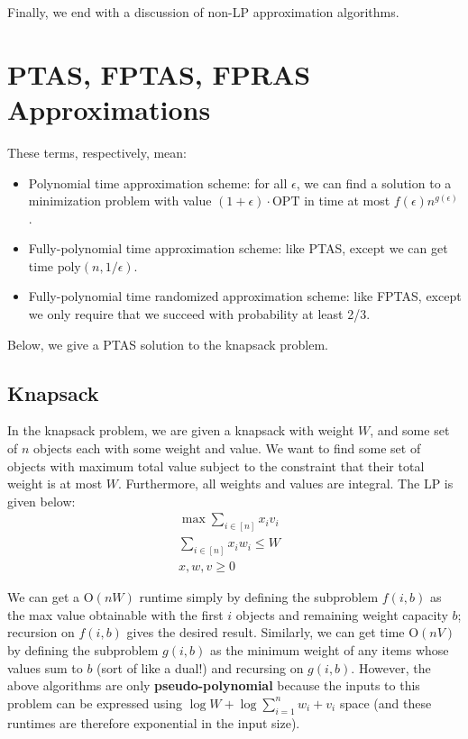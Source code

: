 \documentclass[11pt]{article}
\newcommand{\bigO}{\text{O}}
\begin{document}
Finally, we end with a discussion of non-LP approximation algorithms.

\section{PTAS, FPTAS, FPRAS Approximations}
These terms, respectively, mean:
\begin{itemize}
\setlength\itemsep{0cm}
\item Polynomial time approximation scheme: for all $\epsilon$, we can find a solution to a minimization problem with value $(1+\epsilon) \cdot \text{OPT}$ in time at most $f(\epsilon) n^{g(\epsilon)}$.
\item Fully-polynomial time approximation scheme: like PTAS, except we can get time $\text{poly}(n, 1/\epsilon)$.
\item Fully-polynomial time randomized approximation scheme: like FPTAS, except we only require that we succeed with probability at least 2/3.
\end{itemize}

Below, we give a PTAS solution to the knapsack problem.

\subsection{Knapsack}
In the knapsack problem, we are given a knapsack with weight $W$, and some set of $n$ objects each with some weight and value.  We want to find some set of objects with maximum total value subject to the constraint that their total weight is at most $W$.  Furthermore, all weights and values are integral.  The LP is given below:
\begin{align*}
\max \sum_{i \in [n]} x_i v_i & \\
\sum_{i \in [n]} x_i w_i \le W & \\
x, w, v \ge 0 &
\end{align*}

We can get a $\bigO(nW)$ runtime simply by defining the subproblem $f(i, b)$ as the max value obtainable with the first $i$ objects and remaining weight capacity $b$; recursion on $f(i, b)$ gives the desired result.  Similarly, we can get time $\bigO(nV)$ by defining the subproblem $g(i, b)$ as the minimum weight of any items whose values sum to $b$ (sort of like a dual!) and recursing on $g(i, b)$.  However, the above algorithms are only \textbf{pseudo-polynomial} because the inputs to this problem can be expressed using $\log W + \log \sum_{i = 1}^n w_i + v_i$ space (and these runtimes are therefore exponential in the input size).  
\end{document}
